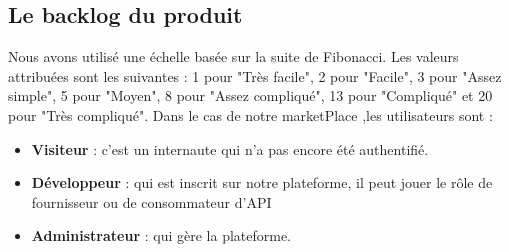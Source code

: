 \subsection{Le backlog du produit  }
Nous avons utilisé une échelle basée sur la suite de Fibonacci. Les valeurs attribuées sont les suivantes  : 1 pour "Très facile", 2 pour "Facile", 3 pour "Assez simple", 5 pour "Moyen", 8 pour "Assez compliqué", 13 pour "Compliqué" et 20 pour "Très compliqué". Dans le cas de notre marketPlace ,les utilisateurs sont :
\begin{itemize}
    \item \textbf{Visiteur }: c’est un internaute qui n'a pas encore été authentifié.
    \item \textbf{Développeur  }: qui est inscrit sur notre plateforme, il peut jouer le rôle de fournisseur ou de consommateur d’API
    \item \textbf{Administrateur }: qui gère la plateforme.
\end{itemize}







\captionsetup[table]{justification=centering}




